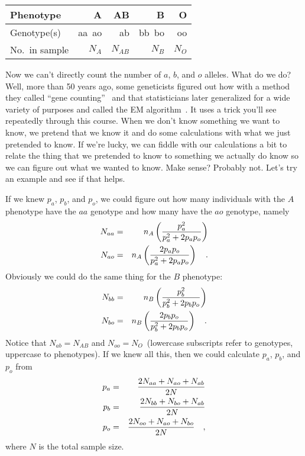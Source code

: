 \documentclass[12pt]{article}
\begin{document}
\begin{center}
\begin{tabular}{l|r|r|r|r}
\hline\hline
Phenotype      & A      & AB       & B       & O  \\
\hline
Genotype(s)    & aa\ ao & ab       & bb\ bo  & oo \\
No.\ in sample & $N_A$  & $N_{AB}$ & $N_{B}$ & $N_O$ \\
\hline
\end{tabular}
\end{center}
Now we can't directly count the number of $a$, $b$, and $o$
alleles. What do we do? Well, more than 50 years ago, some geneticists
figured out how with a method they called ``gene
counting''~\cite{Ceppellini-etal-1955} and that statisticians later
generalized for a wide variety of purposes and called the EM
algorithm~\cite{Dempster-etal-1977}. It uses a trick you'll see
repeatedly through this course. When we don't know something we want
to know, we pretend that we know it and do some calculations with what
we just pretended to know. If we're lucky, we can fiddle with our
calculations a bit to relate the thing that we pretended to know to
something we actually do know so we can figure out what we wanted to
know. Make sense? Probably not. Let's try an example and see if that
helps.

If we knew $p_a$, $p_b$, and $p_o$, we could figure out how many
individuals with the $A$ phenotype have the $aa$ genotype and how many
have the $ao$ genotype, namely
\begin{eqnarray*}
N_{aa} &=& n_A \left({p_a^2 \over p_a^2 + 2p_ap_o}\right) \\
N_{ao} &=& n_A \left({2p_ap_o \over p_a^2 + 2p_ap_o}\right) \quad .
\end{eqnarray*}
Obviously we could do the same thing for the $B$ phenotype:
\begin{eqnarray*}
N_{bb} &=& n_B \left({p_b^2 \over p_b^2 + 2p_bp_o}\right) \\
N_{bo} &=& n_B \left({2p_bp_o \over p_b^2 + 2p_bp_o}\right) \quad .
\end{eqnarray*}
Notice that $N_{ab} = N_{AB}$ and $N_{oo} = N_O$~(lowercase
subscripts refer to genotypes, uppercase to phenotypes). If we knew
all this, then we could calculate $p_a$, $p_b$, and $p_o$ from
\begin{eqnarray*}
p_a &=& {2N_{aa} + N_{ao} + N_{ab} \over 2N} \\
p_b &=& {2N_{bb} + N_{bo} + N_{ab} \over 2N} \\
p_o &=& {2N_{oo} + N_{ao} + N_{bo} \over 2N} \quad ,
\end{eqnarray*}
where $N$ is the total sample size.
\end{document}
